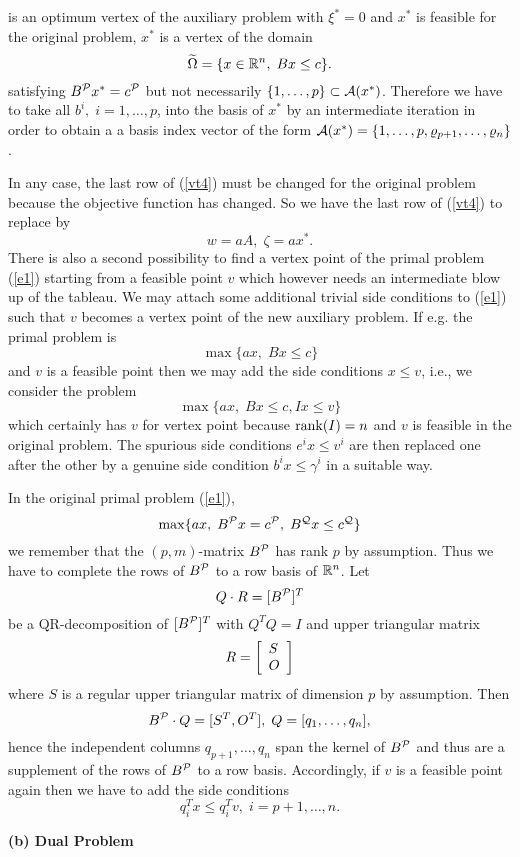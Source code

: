 is an optimum vertex of the auxiliary problem with $\xi ^* = 0$ and $x^*$ is
feasible for the original problem, $x^*$ is a vertex of the domain
\[
\wi{\Omega} = \{x \in \Bbb{R}^n, \; Bx \leq c\}.
\]
satisfying $B^{\P}x^* = c^{\P}$ but not necessarily $\{1,\ldots,p\} \subset
\A(x^*)$. Therefore we have to take all $b^i, \; i = 1,\ldots,p$, into the
basis of $x^*$ by an intermediate iteration in order to obtain a
a basis index vector of the form $\A(x^*) = \{1,\ldots,p,\rho
_{p+1},\ldots,\rho _n\}$.
\par
In any case, the last row of (\ref{vt4}) must be changed for the original
problem because the objective function has changed.  So we have the last row of
(\ref{vt4}) to replace by
\[
w = aA, \; \zeta  = ax^*.
\]
There is also a second possibility to find a vertex point of the primal problem
(\ref{e1}) starting from a feasible point $v$ which however needs an
intermediate blow up of the tableau.  We may attach some additional trivial
side conditions to (\ref{e1}) such that $v$ becomes a vertex point of the new
auxiliary problem.  If e.g.  the primal problem is
\[
\max \{ax, \; Bx \leq c\}
\]
and $v$ is a feasible point then we may add the side conditions $x \leq v$,
i.e., we consider the problem
%
\[
\max \{ax, \; Bx \leq c, Ix \leq v\}
\]
which certainly has $v$ for vertex point because $\rank (I) = n$ and $v$ is
feasible in the original problem. The spurious side conditions $e^ix \leq
v^i$ are then replaced one after the other by a genuine side condition $b^ix
\leq \gamma ^i$ in a suitable way.
\par
In the original primal problem (\ref{e1}),
\[
\max \{ ax, \; B^{\P}x = c^{\P}, \; B^{\Q}x \leq c^{\Q} \}
\]
we remember that the $(p,m)$-matrix $B^{\P}$ has rank $p$ by assumption. Thus
we have to complete the rows of $B^{\P}$ to a row basis of $\Bbb{R}^n$. Let
\[
Q \cdot R = [B^{\P}]^T
\]
be a QR-decomposition of $[B^{\P}]^T$ with $Q^TQ = I$ and upper triangular
matrix
\[
R = \ba{[}{l}S\\ O \ea{]}
\]
where $S$ is a regular upper triangular matrix of dimension $p$ by assumption.
Then
\[
B^{\P}\cdot Q = [S^T, O^T], \; Q = [q_1, \ldots, q_n],
\]
hence the independent columns $q_{p+1}, \ldots, q_n$ span the kernel of
$B^{\P}$ and thus are a supplement of the rows of $B^{\P}$ to a row basis.
Accordingly, if $v$ is a feasible point again then we have to add the side
conditions
\[
q^T_ix \leq q^T_iv, \; i = p+1, \ldots, n.
\]
\par
{\bf (b) Dual Problem} \hfill\\
